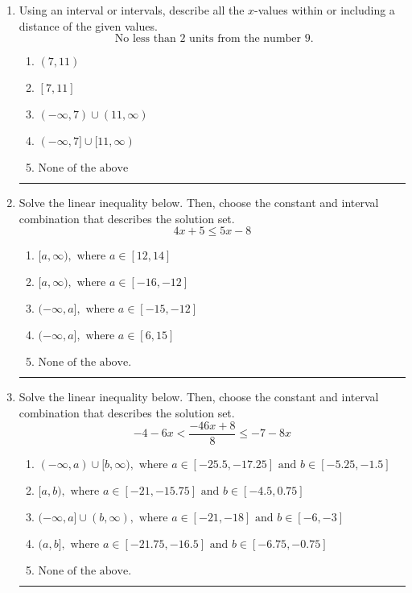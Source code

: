 \documentclass[14pt]{extbook}
\newcommand{\litem}[1]{\item#1\hspace*{-1cm}\rule{\textwidth}{0.4pt}}
\begin{document}
\begin{enumerate}
\litem{
Using an interval or intervals, describe all the $x$-values within or including a distance of the given values.\[ \text{ No less than } 2 \text{ units from the number } 9. \]\begin{enumerate}[label=\Alph*.]
\item \( (7, 11) \)
\item \( [7, 11] \)
\item \( (-\infty, 7) \cup (11, \infty) \)
\item \( (-\infty, 7] \cup [11, \infty) \)
\item \( \text{None of the above} \)

\end{enumerate} }
\litem{
Solve the linear inequality below. Then, choose the constant and interval combination that describes the solution set.\[ 4x + 5 \leq 5x -8 \]\begin{enumerate}[label=\Alph*.]
\item \( [a, \infty), \text{ where } a \in [12, 14] \)
\item \( [a, \infty), \text{ where } a \in [-16, -12] \)
\item \( (-\infty, a], \text{ where } a \in [-15, -12] \)
\item \( (-\infty, a], \text{ where } a \in [6, 15] \)
\item \( \text{None of the above}. \)

\end{enumerate} }
\litem{
Solve the linear inequality below. Then, choose the constant and interval combination that describes the solution set.\[ -4 - 6 x < \frac{-46 x + 8}{8} \leq -7 - 8 x \]\begin{enumerate}[label=\Alph*.]
\item \( (-\infty, a) \cup [b, \infty), \text{ where } a \in [-25.5, -17.25] \text{ and } b \in [-5.25, -1.5] \)
\item \( [a, b), \text{ where } a \in [-21, -15.75] \text{ and } b \in [-4.5, 0.75] \)
\item \( (-\infty, a] \cup (b, \infty), \text{ where } a \in [-21, -18] \text{ and } b \in [-6, -3] \)
\item \( (a, b], \text{ where } a \in [-21.75, -16.5] \text{ and } b \in [-6.75, -0.75] \)
\item \( \text{None of the above.} \)


\end{enumerate}}
\end{enumerate}
\end{document}

